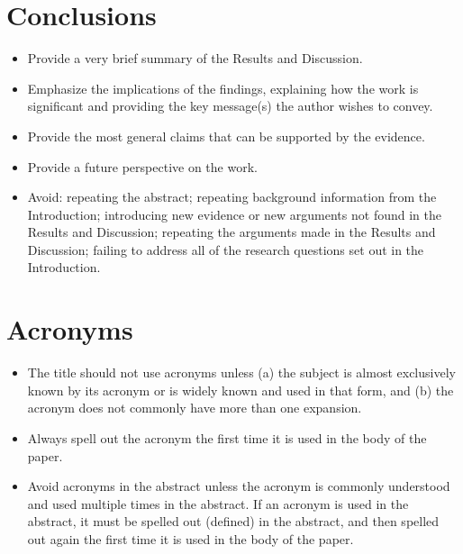 \section*{Conclusions}
\begin{itemize}
  \item Provide a very brief summary of the Results and Discussion.
  \item Emphasize the implications of the findings, explaining how the work is significant and providing the key message(s) the author wishes to convey.
  \item Provide the most general claims that can be supported by the evidence.
  \item Provide a future perspective on the work.
  \item Avoid: repeating the abstract; repeating background information from the Introduction; introducing new evidence or new arguments not found in the Results and Discussion; repeating the arguments made in the Results and Discussion; failing to address all of the research questions set out in the Introduction.
\end{itemize}

\section*{Acronyms}
\begin{itemize}
  \item The title should not use acronyms unless (a) the subject is almost exclusively known by its acronym or is widely known and used in that form, and (b) the acronym does not commonly have more than one expansion.
  \item Always spell out the acronym the first time it is used in the body of the paper.
  \item Avoid acronyms in the abstract unless the acronym is commonly understood and used multiple times in the abstract. If an acronym is used in the abstract, it must be spelled out (defined) in the abstract, and then spelled out again the first time it is used in the body of the paper.
\end{itemize}

